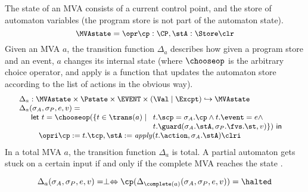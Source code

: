 The state of an MVA consists of a current control point, and the store of
automaton variables (the program store is not part of the automaton state).
\[{\small
\MVAstate = \opr \cp : \CP, \stA : \Store \clr}
\]
Given an MVA \(a\), the transition function \(\Delta_a\)
describes how given a program store and an event, \(a\) changes its
internal state (where \(\chooseop\) is the arbitrary choice operator,
and \textsf{apply} is a function that updates the automaton store
according to the list of actions in the obvious way).
\[{\small
\begin{array}{l}
\Delta_a  :  \MVAstate \times \Pstate \times \EVENT \times (\Val \mid
\Excpt) \hookrightarrow
\MVAstate\\
\Delta_a(\sigma_A, \sigma_P, e, v) = \\
\quad
\begin{array}[t]{l}
\mathsf{let\ }t = \chooseop(\{t\in \trans(a)\mid
  \begin{array}[t]{l}
     t.\scp = \sigma_A.\cp \wedge t.\event = e \wedge \\
     t.\guard(\sigma_A.\stA, \sigma_P.\fvs.\st, v)\}) \mathsf{\ in}
  \end{array}\\
\quad \opri \cp := t.\tcp, \stA := \mathit{apply}(t.\action,
\sigma_A.\stA) \clri
\end{array}

\end{array}}
\]
In a total MVA $a$, the transition function \(\Delta_a\) is total.
A partial automaton gets stuck on a certain input if and only if the
complete MVA reaches the state \halted.

\begin{equation}\label{MVAcompletionProp}
\Delta_a(\sigma_A, \sigma_P, e, v) = \perp \Leftrightarrow
\cp (\Delta_{\complete(a)}(\sigma_A, \sigma_P, e, v)) = \halted
\end{equation}


